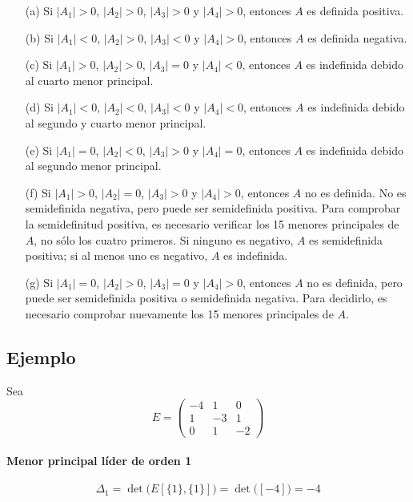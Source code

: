 \documentclass{article}
\begin{document}
\begin{enumerate}
  \item[(a)] Si \(\lvert A_1\rvert>0\), \(\lvert A_2\rvert>0\), \(\lvert A_3\rvert>0\) y \(\lvert A_4\rvert>0\), entonces \(A\) es definida positiva.
  \item[(b)] Si \(\lvert A_1\rvert<0\), \(\lvert A_2\rvert>0\), \(\lvert A_3\rvert<0\) y \(\lvert A_4\rvert>0\), entonces \(A\) es definida negativa.
  \item[(c)] Si \(\lvert A_1\rvert>0\), \(\lvert A_2\rvert>0\), \(\lvert A_3\rvert=0\) y \(\lvert A_4\rvert<0\), entonces \(A\) es indefinida debido al cuarto menor principal.
  \item[(d)] Si \(\lvert A_1\rvert<0\), \(\lvert A_2\rvert<0\), \(\lvert A_3\rvert<0\) y \(\lvert A_4\rvert<0\), entonces \(A\) es indefinida debido al segundo y cuarto menor principal.
  \item[(e)] Si \(\lvert A_1\rvert=0\), \(\lvert A_2\rvert<0\), \(\lvert A_3\rvert>0\) y \(\lvert A_4\rvert=0\), entonces \(A\) es indefinida debido al segundo menor principal.
  \item[(f)] Si \(\lvert A_1\rvert>0\), \(\lvert A_2\rvert=0\), \(\lvert A_3\rvert>0\) y \(\lvert A_4\rvert>0\), entonces \(A\) no es definida. No es semidefinida negativa, pero puede ser semidefinida positiva. Para comprobar la semidefinitud positiva, es necesario verificar los 15 menores principales de \(A\), no sólo los cuatro primeros. Si ninguno es negativo, \(A\) es semidefinida positiva; si al menos uno es negativo, \(A\) es indefinida.
  \item[(g)] Si \(\lvert A_1\rvert=0\), \(\lvert A_2\rvert>0\), \(\lvert A_3\rvert=0\) y \(\lvert A_4\rvert>0\), entonces \(A\) no es definida, pero puede ser semidefinida positiva o semidefinida negativa. Para decidirlo, es necesario comprobar nuevamente los 15 menores principales de \(A\).
\end{enumerate}


\subsection*{Ejemplo}

Sea  
\[
E = \begin{pmatrix}
-4 & 1 & 0\\
1 & -3 & 1\\
0 & 1 & -2
\end{pmatrix}
\]

\paragraph*{Menor principal líder de orden 1}  
\[
\Delta_1 = \det\bigl(E[\{1\},\{1\}]\bigr) = \det\bigl([-4]\bigr) = -4
\]
\end{document}
